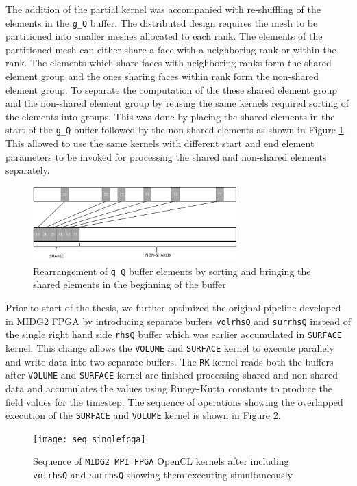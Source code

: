 The addition of the partial kernel was accompanied with re-shuffling of the elements in the \texttt{g\_Q}
buffer. The distributed design requires the mesh to be partitioned into smaller meshes allocated
to each rank. The elements of the partitioned mesh can either share a face with a neighboring
rank or within the rank. The elements which share faces with neighboring ranks form the shared
element group and the ones sharing faces within rank form the non-shared element group.
To separate the computation of the these shared element group and the non-shared element group
by reusing the same kernels required sorting of the elements into groups. This was done by
placing the shared elements in the start of the \texttt{g\_Q} buffer followed by the non-shared
elements as shown in Figure \ref{fig:rearrange}. This allowed to use the same kernels with different
start and end element parameters to be invoked for processing the shared and non-shared elements separately.
\begin{figure}%
    \centering
    \includegraphics[width=0.7\textwidth]{images/rearrange}
    \caption{Rearrangement of \texttt{g\_Q} buffer elements by sorting and bringing the
    shared elements in the beginning of the buffer}
    \label{fig:rearrange}
\end{figure}

Prior to start of the thesis, we further optimized the original pipeline developed in MIDG2 FPGA
by introducing separate buffers \texttt{volrhsQ} and \texttt{surrhsQ} instead of the single
right hand side \texttt{rhsQ} buffer which was earlier accumulated in \texttt{SURFACE} kernel.
This change allows the \texttt{VOLUME} and \texttt{SURFACE} kernel to execute parallely and write data into
two separate buffers. The \texttt{RK} kernel reads both the buffers after \texttt{VOLUME} and \texttt{SURFACE} kernel
are finished processing shared and non-shared data and accumulates the values using Runge-Kutta
constants to produce the field values for the timestep. The sequence of operations
showing the overlapped execution of the \texttt{SURFACE} and \texttt{VOLUME} kernel is shown in Figure \ref{fig:seq_singlefpga}.

\begin{figure}[ht]%
    \centering
    \texttt{[image: seq\_singlefpga]}
    \caption{Sequence of \texttt{MIDG2 MPI FPGA} OpenCL kernels after including \texttt{volrhsQ} and \texttt{surrhsQ}
    showing them executing simultaneously}
    \label{fig:seq_singlefpga}
\end{figure}

